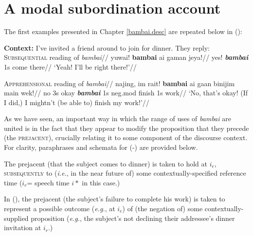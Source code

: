 \section{A modal subordination account}\label{bambai.subord}


The first examples presented in Chapter \ref{bambai.desc} are repeated below in (\nextx):

\pex{}\textbf{Context:} \textup{I've invited a friend around to join for dinner. They reply:}
\a{}\begingl\glpreamble\textsc{Subsequential} reading of \textit{bambai}//
\gla yuwai! \textbf{bambai} ai gaman jeya!//
\glb yes! \textbf{\textit{bambai}} 1s come there//
\glft ‘Yeah! I’ll be right there!’//\endgl

\a\begingl\glpreamble {}\textsc{Apprehensional} reading of \textit{bambai}//
\gla najing, im rait! \textbf{bambai} ai gaan binijim main wek!//
\glb no 3s okay \textbf{\textit{bambai}} 1s {\sc neg.mod} finish 1s work//
\glft ‘No, that’s okay! (If I did,) I mightn’t (be able to) finish my work!'\trailingcitation{[GT~20170316]}//\endgl
\xe

As we have seen, an important way in which the range of uses of \textit{bambai} are united is in the fact that they appear to modify the proposition that they precede (the \textsc{prejacent}), crucially relating it to some component of the discourse context. For clarity, paraphrases and schemata for (-) are provided below. 



\pex[exno=\getref{minpair}]
\a[label=a′]  The prejacent (that the subject comes to dinner) is taken to hold at $ i_e $, \textsc{subsequently} to (\textit{i.e.}, in the near future of) some contextually-specified reference time ($ i_r $= speech time $ i* $ in this case.)

{\centering
{}
}

\a[label=b′] In (), the prejacent (the subject's failure to complete his work) is taken to represent a possible outcome (\textit{e.g.}, at $ i_e $) of (the negation of) some contextually-supplied proposition (\textit{e.g.}, the subject's not declining their addressee's dinner invitation at $ i_r $.)

